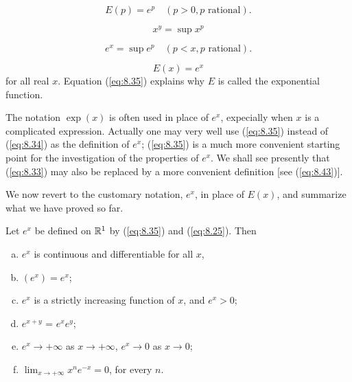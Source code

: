 \begin{equation}
    \label{eq:8.32}
    E(p) = e^p
    \quad (p>0, p \text{ rational}).
\end{equation}

\begin{equation}
    \label{eq:8.33}
    x^y = \sup x^p
\end{equation}

\begin{equation}
    \label{eq:8.34}
    e^x = \sup e^p
    \quad (p<x, p \text{ rational}).
\end{equation}

\begin{equation}
    \label{eq:8.35}
    E(x) = e^x
\end{equation}
for all real $x$. Equation (\ref{eq:8.35}) explains why $E$ is called the exponential function.

The notation $\exp(x)$ is often used in place of $e^x$, 
expecially when $x$ is a complicated expression.
Actually one may very well use (\ref{eq:8.35}) instead of (\ref{eq:8.34}) as the definition of $e^x$;
(\ref{eq:8.35}) is a much more convenient starting point for the investigation of the properties of $e^x$. 
We shall see presently that (\ref{eq:8.33}) may also be replaced by a
more convenient definition [see (\ref{eq:8.43})].

We now revert to the customary notation, $e^x$, in place of $E(x)$, 
and summarize what we have proved so far.

\begin{thm}
    \label{thm:8.6}
    Let $e^x$ be defined on ${\protect\mathbb R}^1$ by (\ref{eq:8.35}) and (\ref{eq:8.25}). Then
    \begin{enumerate}[(a)]
        \item $e^x$ is continuous and differentiable for all $x$,
        \item $(e^x) = e^x$;
        \item $e^x$ is a strictly increasing function of $x$, and $e^x > 0$;
        \item $e^{x+y}$ = $e^x e^y$;
        \item $e^x \rightarrow +\infty$ as $x \rightarrow +\infty$, $e^x \rightarrow 0$ as $x \rightarrow 0$;
        \item $\lim_{x \to +\infty}  x^n e^{-x} = 0$, for every $n$.
    \end{enumerate}
\end{thm}


